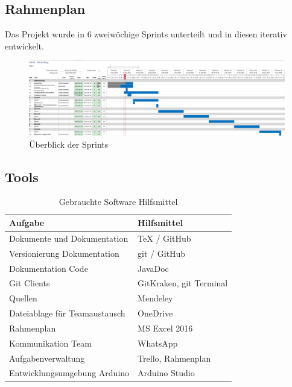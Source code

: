 \documentclass[a4paper]{scrreprt}
\begin{document}
\subsection{Rahmenplan}

Das Projekt wurde in 6 zweiwöchige Sprints unterteilt und in diesen iterativ entwickelt.

\vspace{1em}

\begin{figure}[h!]
	\includegraphics[keepaspectratio, width=\textwidth]{Rahmenplan}
	\caption{Überblick der Sprints}
\end{figure}

\subsection{Tools}
\label{sec:Tools}
\begin{table}[h!]
	\begin{tabular}{|p{}|p{}|}
		\hline
		\textbf{Aufgabe} & \textbf{Hilfsmittel} \\
		\hline
		Dokumente und Dokumentation & TeX / GitHub \\
		\hline
		Versionierung Dokumentation & git / GitHub\\
		\hline
		Dokumentation Code & JavaDoc \\
		\hline
		Git Clients & GitKraken, git Terminal\\
		\hline
		Quellen & Mendeley \\
		\hline
		Dateiablage für Teamaustausch & OneDrive \\
		\hline
		Rahmenplan & MS Excel 2016 \\
		\hline
		Kommunikation Team & WhatsApp\\
		\hline
		Aufgabenverwaltung & Trello, Rahmenplan\\
		\hline
		Entwicklungsumgebung Arduino & Arduino Studio\\
		\hline
	\end{tabular}
	\caption{Gebrauchte Software Hilfsmittel}
	\label{tab:SWTools}
\end{table}
\end{document}
